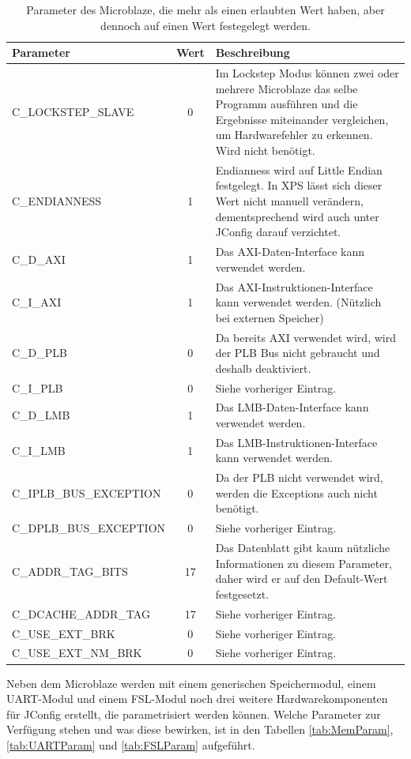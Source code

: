 \begin{table}[ht!]
	\begin{tabular}{|l|c|p{10cm}|}
		\hline \textbf{Parameter} & \textbf{Wert} & \textbf{Beschreibung} \\ 
		\hline C\_LOCKSTEP\_SLAVE & 0 & Im Lockstep Modus können zwei oder mehrere \newline Microblaze das selbe Programm ausführen und die Ergebnisse miteinander vergleichen, um Hardwarefehler zu erkennen. Wird nicht benötigt.\\ 
		\hline C\_ENDIANNESS & 1 & Endianness wird auf Little Endian festgelegt. In XPS lässt sich dieser Wert nicht manuell verändern, dementsprechend wird auch unter JConfig darauf verzichtet.\\ 
		\hline C\_D\_AXI & 1 & Das AXI-Daten-Interface kann verwendet werden. \\ 
		\hline C\_I\_AXI & 1 & Das AXI-Instruktionen-Interface kann verwendet werden. (Nützlich bei externen Speicher) \\ 
		\hline C\_D\_PLB & 0 & Da bereits AXI verwendet wird, wird der PLB Bus nicht gebraucht und deshalb deaktiviert. \\ 
		\hline C\_I\_PLB & 0 & Siehe vorheriger Eintrag. \\ 
		\hline C\_D\_LMB & 1 & Das LMB-Daten-Interface kann verwendet werden. \\ 
		\hline C\_I\_LMB & 1 & Das LMB-Instruktionen-Interface kann verwendet werden. \\ 
		\hline C\_IPLB\_BUS\_EXCEPTION & 0 & Da der PLB nicht verwendet wird, werden die Exceptions auch nicht benötigt. \\ 
		\hline C\_DPLB\_BUS\_EXCEPTION & 0 & Siehe vorheriger Eintrag. \\ 
		\hline C\_ADDR\_TAG\_BITS & 17 & Das Datenblatt gibt kaum nützliche Informationen zu diesem Parameter, daher wird er auf den Default-Wert festgesetzt. \\ 
		\hline C\_DCACHE\_ADDR\_TAG & 17 & Siehe vorheriger Eintrag. \\ 
		\hline C\_USE\_EXT\_BRK & 0 & Siehe vorheriger Eintrag. \\ 
		\hline C\_USE\_EXT\_NM\_BRK & 0 & Siehe vorheriger Eintrag. \\ 
		\hline 
	\end{tabular}
	\centering
	\caption{Parameter des Microblaze, die mehr als einen erlaubten Wert haben, aber dennoch auf einen Wert festegelegt werden.}
	\label{tab:MicParam}
\end{table}
Neben dem Microblaze werden mit einem generischen Speichermodul, einem UART-Modul und einem FSL-Modul noch drei weitere Hardwarekomponenten für JConfig erstellt, die parametrisiert werden können. Welche Parameter zur Verfügung stehen und was diese bewirken, ist in den Tabellen \ref{tab:MemParam}, \ref{tab:UARTParam} und \ref{tab:FSLParam} aufgeführt.

